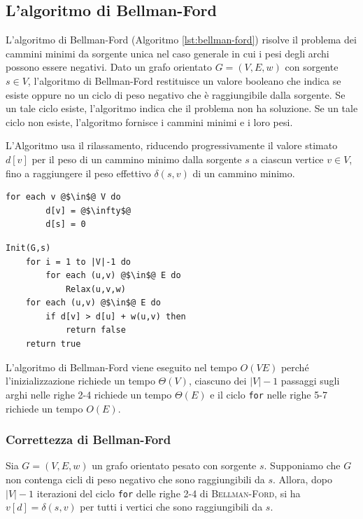 \subsection{L'algoritmo di Bellman-Ford}
L'algoritmo di Bellman-Ford (Algoritmo \ref{lst:bellman-ford}) risolve il problema dei cammini minimi da sorgente unica nel caso generale in cui i pesi degli archi possono essere negativi. Dato un grafo orientato $G=(V,E,w)$ con sorgente $s \in V$, l'algoritmo di Bellman-Ford restituisce un valore booleano che indica se esiste oppure no un ciclo di peso negativo che è raggiungibile dalla sorgente. Se un tale ciclo esiste, l'algoritmo indica che il problema non ha soluzione. Se un tale ciclo non esiste, l'algoritmo fornisce i cammini minimi e i loro pesi.

L'Algoritmo usa il rilassamento, riducendo progressivamente il valore stimato $d[v]$ per il peso di un cammino minimo dalla sorgente $s$ a ciascun vertice $v \in V$, fino a raggiungere il peso effettivo $\delta(s,v)$ di un cammino minimo.
\begin{lstlisting}[caption={\textsc{Init}(G,s)},language=asd]
	for each v @$\in$@ V do
		d[v] = @$\infty$@
		d[s] = 0
\end{lstlisting}
\begin{lstlisting}[caption={\textsc{Bellman-Ford}(G,w,s)},language=asd,label=lst:bellman-ford]
	Init(G,s)
	for i = 1 to |V|-1 do
		for each (u,v) @$\in$@ E do
			Relax(u,v,w)
	for each (u,v) @$\in$@ E do
		if d[v] > d[u] + w(u,v) then
			return false
	return true
\end{lstlisting}
L'algoritmo di Bellman-Ford viene eseguito nel tempo $O(VE)$ perché l'inizializzazione richiede un tempo $\Theta(V)$, ciascuno dei $|V|-1$ passaggi sugli arghi nelle righe 2-4 richiede un tempo $\Theta(E)$ e il ciclo \texttt{for} nelle righe 5-7 richiede un tempo $O(E)$.

\subsubsection{Correttezza di Bellman-Ford}


\begin{lemmabox}
	Sia $G=(V,E,w)$ un grafo orientato pesato con sorgente $s$. Supponiamo che $G$ non contenga cicli di peso negativo che sono raggiungibili da $s$. Allora, dopo $|V|-1$ iterazioni del ciclo \texttt{for} delle righe 2-4 di \textsc{Bellman-Ford}, si ha $v[d] = \delta(s,v)$ per tutti i vertici che sono raggiungibili da $s$.
\end{lemmabox}

